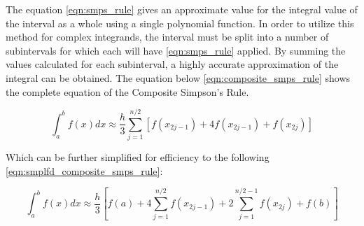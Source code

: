 \documentclass{paper}
\begin{document}
The equation \eqref{eqn:smps_rule} gives an approximate value for the integral value of the interval as a whole using a single polynomial function.
In order to utilize this method for complex integrands, the interval must be split into a number of subintervals for which each will have \eqref{eqn:smps_rule} applied.
By summing the values calculated for each subinterval, a highly accurate approximation of the integral can be obtained.
The equation below \eqref{eqn:composite_smps_rule} shows the complete equation of the Composite Simpson's Rule.

\begin{equation}
    \label{eqn:composite_smps_rule}
    \int_a^b f(x) dx \approx \dfrac{h}{3} \sum_{j=1}^{n / 2} \left[f(x_{2j-1}) + 4f(x_{2j-1}) + f(x_{2j})\right]
\end{equation}

Which can be further simplified for efficiency to the following \eqref{eqn:smplfd_composite_smps_rule}:

\begin{equation}
    \label{eqn:smplfd_composite_smps_rule}
    \int_a^b f(x) dx \approx \dfrac{h}{3} \left[f(a) + 4 \sum_{j=1}^{n / 2} f(x_{2j-1}) + 2  \sum_{j=1}^{n / 2 - 1} f(x_{2j}) + f(b)\right]
\end{equation}
\end{document}
